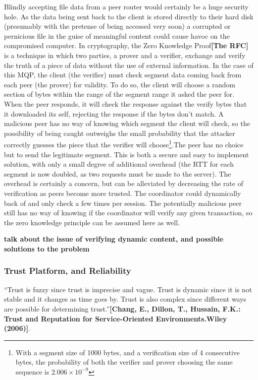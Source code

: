 \documentclass[12pt]{article}
\newcommand{\comment}[1]
{{\bfseries \color{blue} #1}}
\newcommand{\lcite}[1]
{{\bfseries\color{orange}[#1]}}
\begin{document}
		Blindly accepting file data from a peer router would certainly be a huge security hole. As the data being sent back to the client is stored directly to their hard disk (presumably with the pretense of being accessed very soon) a corrupted or pernicious file in the guise of meaningful content could cause havoc on the compromised computer. In cryptography, the Zero Knowledge Proof\lcite{The RFC} is a technique in which two parties, a prover and a verifier, exchange and verify the truth of a piece of data without the use of external information. In the case of this MQP, the client (the verifier) must check segment data coming back from each peer (the prover) for validity. To do so, the client will choose a random section of bytes within the range of the segment range it asked the peer for. When the peer responds, it will check the response against the verify bytes that it downloaded its self, rejecting the response if the bytes don't match. A malicious peer has no way of knowing which segment the client will check, so the possibility of being caught outweighs the small probability that the attacker correctly guesses the piece that the verifier will choose\footnote{With a segment size of 1000 bytes, and a verification size of 4 consecutive bytes, the probability of both the verifier and prover choosing the same sequence is $2.006\times10^{-9}$}.The peer has no choice but to send the legitimate segment. This is both a secure and easy to implement solution, with only a small degree of additional overhead (the RTT for each segment is now doubled, as two requests must be made to the server). The overhead is certainly a concern, but can be alleviated by decreasing the rate of verification as peers become more trusted. The coordinator could dynamically back of and only check a few times per session. The potentially malicious peer still has no way of knowing if the coordinator will verify any given transaction, so the zero knowledge principle can be assumed here as well.

		\comment{talk about the issue of verifying dynamic content, and possible solutions to the problem}

		\subsubsection{Trust Platform, and Reliability}

			``Trust is fuzzy since trust is imprecise and vague. Trust is dynamic since it is not stable and it changes as time goes by. Trust is also complex since different ways are possible for determining trust.''\lcite{Chang, E., Dillon, T., Hussain, F.K.: Trust and Reputation for Service-Oriented Environments.Wiley (2006)}. 
\end{document}
